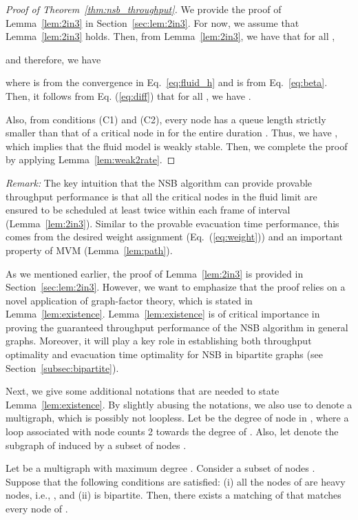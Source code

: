 \documentclass[10pt,journal,compsoc]{IEEEtran}
\newcommand{\high}[1]{{\color{black}{#1}}}
\begin{document}
\begin{proof}[Proof of Theorem~\ref{thm:nsb_throughput}]
We provide the proof of Lemma~\ref{lem:2in3} in Section~\ref{sec:lem:2in3}.
For now, we assume that Lemma~\ref{lem:2in3} holds. \high{Note that interval  
contains at least  complete frames.}
Then, from Lemma~\ref{lem:2in3}, we have that for all ,

and therefore, we have

where  is from the convergence in Eq.~\eqref{eq:fluid_h} and  is from Eq.~\eqref{eq:beta}. 
Then, it follows from Eq. (\ref{eq:diff}) that for all , we have .

Also, from conditions (C1) and (C2), every node  has a queue length strictly smaller 
than that of a critical node in  for the entire duration . Thus, we have
, which implies that the fluid model is weakly stable. Then, we complete 
the proof by applying Lemma~\ref{lem:weak2rate}.
\end{proof}

\emph{Remark:} The key intuition that the NSB algorithm can provide provable throughput performance 
is that all the critical nodes in the fluid limit are ensured to be scheduled at least twice within each frame of 
interval  (Lemma~\ref{lem:2in3}). Similar to the provable evacuation time performance, this comes from 
the desired weight assignment (Eq.~(\ref{eq:weight})) and an important property of MVM (Lemma~\ref{lem:path}).

As we mentioned earlier, the proof of Lemma~\ref{lem:2in3} is provided in Section~\ref{sec:lem:2in3}. 
However, we want to emphasize that the proof relies on a novel application of graph-factor theory, 
which is stated in Lemma~\ref{lem:existence}.
Lemma~\ref{lem:existence} is of critical importance in proving the guaranteed
throughput performance of the NSB algorithm in general graphs. Moreover, it will play a key 
role in establishing both throughput optimality and evacuation time optimality for NSB in bipartite 
graphs (see Section~\ref{subsec:bipartite}).

Next, we give some additional notations that are needed to state Lemma~\ref{lem:existence}.
By slightly abusing the notations, we also use  to denote a multigraph,
which is possibly not loopless. 
Let  be the degree of node  in , where a loop associated with node  counts 2 
towards the degree of . 
Also, let  denote the subgraph of  induced by a subset of nodes . 

\begin{lemma}
\label{lem:existence}
Let  be a multigraph with maximum degree .
Consider a subset of nodes .
Suppose that the following conditions are satisfied: 
(i) all the nodes of  are heavy nodes, i.e., , 
and (ii)  is bipartite. Then, there exists a matching of  that matches every node of .
\end{lemma}
\end{document}
